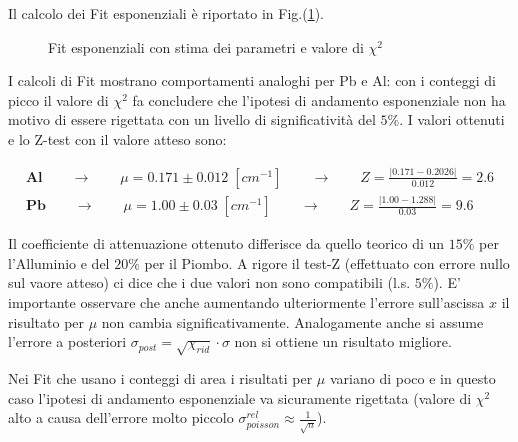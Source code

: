 \documentclass[12pt,a4paper,openright,twoside]{article}
\numberwithin{equation}{section} %
\begin{document}
Il calcolo dei Fit esponenziali è riportato in Fig.(\ref{fit}).


\begin{figure}[h]
 \centering
   \caption{Fit esponenziali con stima dei parametri e valore di $\chi ^2$}
   \label{fit}
 \end{figure}

I calcoli di Fit mostrano comportamenti analoghi per Pb e Al: con i conteggi di picco il valore di $\chi ^2$ fa concludere che l'ipotesi di andamento esponenziale non ha motivo di essere rigettata con un livello di significatività del $5 \%$.
I valori ottenuti e lo Z-test con il valore atteso sono:

\begin{gather}
\mathbf{Al} \qquad \rightarrow \qquad \mu = 0.171 \pm 0.012 \; [cm^{-1}] \qquad \rightarrow \qquad Z=\frac{|0.171-0.2026|}{0.012}=2.6 \\ 
\mathbf{Pb} \qquad \rightarrow \qquad \mu = 1.00 \pm 0.03 \; [cm^{-1}] \qquad \rightarrow \qquad Z=\frac{|1.00-1.288|}{0.03}=9.6
\label{ris}
\end{gather}

Il coefficiente di attenuazione ottenuto differisce da quello teorico di un $15 \% $ per l'Alluminio e del $20 \% $ per il Piombo.
A rigore il test-Z (effettuato con errore nullo sul vaore atteso) ci dice che i due valori non sono compatibili (l.s. $5\%$).
E' importante osservare che anche aumentando ulteriormente l'errore sull'ascissa $x$ il risultato per $\mu$ non cambia significativamente.
Analogamente anche si assume l'errore a posteriori $\sigma_{post}= \sqrt{\chi_{rid}} \cdot \sigma$ non si ottiene un risultato migliore.

Nei Fit che usano i conteggi di area i risultati per $\mu$ variano di poco e in questo caso l'ipotesi di andamento esponenziale va sicuramente rigettata (valore di $\chi ^2$ alto a causa dell'errore molto piccolo $ \sigma_{ poisson} ^{rel} \approx \frac{1}{\sqrt{n}}$).
\end{document}
